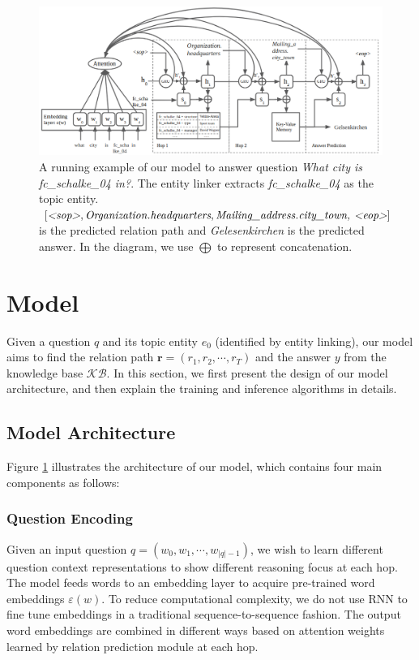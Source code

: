 \begin{figure}[t]
\includegraphics[width=2.1\columnwidth]{figs/model2.png}
\caption{\fontsize{10}{12}\selectfont A running example of our model to answer question \textit{What city is fc\_schalke\_04 in?}. The entity linker extracts \textit{fc\_schalke\_04} as the topic entity. $[\textit{\textless sop\textgreater}, \textit{Organization.headquarters} , \textit{Mailing\_address.city\_town, \textless eop\textgreater}]$ is the predicted relation path and \textit{Gelesenkirchen} is the predicted answer. In the diagram, we use $\bigoplus$ to represent concatenation. }
\label{fig:model}
\end{figure}


\section{Model}
 Given a question $q$ and its topic entity $e_0$ (identified by entity linking), our model aims to find the relation path $\mathbf{r} = (r_{1}, r_{2}, \cdots, r_{T})$ and the answer $y$ from the knowledge base $\mathcal{KB}$. In this section, we first present the design of our model architecture, and then explain the training and inference algorithms in details.  

\subsection{Model Architecture}


Figure \ref{fig:model} illustrates the architecture of our model, which contains four main components as follows:

\subsubsection{Question Encoding} Given an input question $q=(w_0, w_1, \cdots, w_{|q|-1})$, we wish to learn different question context representations to show different reasoning focus at each hop. The model feeds words to an embedding layer to acquire pre-trained word embeddings $\varepsilon(w)$. 
To reduce computational complexity, we do not use RNN to fine tune embeddings in a traditional sequence-to-sequence fashion. The output word embeddings are combined in different ways based on attention weights learned by relation prediction module at each hop.


